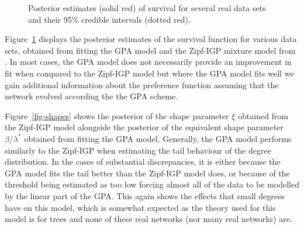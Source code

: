 \documentclass[
  sn-basic,
]{sn-jnl}
\theoremstyle{plain}
\theoremstyle{plain}
\theoremstyle{remark}
\begin{document}
\begin{figure}


\caption{\label{fig-real1}Posterior estimates (solid red) of survival
for several real data sets and their 95\% credible intervals (dotted
red).}

\end{figure}%

Figure~\ref{fig-real1} displays the posterior estimates of the survival
function for various data sets, obtained from fitting the GPA model and
the Zipf-IGP mixture model from \citet{Lee24}. In most cases, the GPA
model does not necessarily provide an improvement in fit when compared
to the Zipf-IGP model but where the GPA model fits well we gain
additional information about the preference function assuming that the
network evolved according the the GPA scheme.

Figure~\ref{fig-shapes} shows the posterior of the shape parameter
\(\xi\) obtained from the Zipf-IGP model alongside the posterior of the
equivalent shape parameter \(\beta/\lambda^*\) obtained from fitting the
GPA model. Generally, the GPA model performs similarly to the Zipf-IGP
when estimating the tail behaviour of the degree distribution. In the
cases of substantial discrepancies, it is either because the GPA model
fits the tail better than the Zipf-IGP model does, or because of the
threshold being estimated as too low forcing almost all of the data to
be modelled by the linear part of the GPA. This again shows the effects
that small degrees have on this model, which is somewhat expected as the
theory used for this model is for trees and none of these real networks
(nor many real networks) are.
\end{document}
